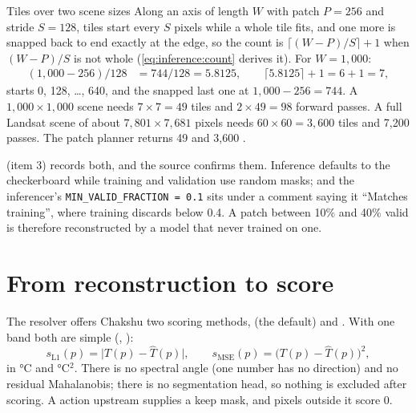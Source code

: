 \begin{worked}[label={we:chakshu:tiles}]{Tiles over two scene sizes}
Along an axis of length $W$ with patch $P=256$ and stride $S=128$, tiles start every $S$ pixels while a whole tile
fits, and one more is snapped back to end exactly at the edge, so the count is $\lceil(W-P)/S\rceil+1$ when
$(W-P)/S$ is not whole (\cref{eq:inference:count} derives it). For $W=1{,}000$:
\begin{align*}
(1{,}000-256)/128 &= 744/128 = 5.8125, \qquad \lceil5.8125\rceil+1 = 6+1 = 7,
\end{align*}
starts 0, 128, \dots, 640, and the snapped last one at $1{,}000-256=744$. A $1{,}000\times1{,}000$ scene needs
$7\times7=49$ tiles and $2\times49=98$ forward passes. A full Landsat scene of about $7{,}801\times7{,}681$ pixels
\tagA{} needs $60\times60=3{,}600$ tiles and 7,200 passes. The patch planner returns 49 and 3,600 \tagC.
\end{worked}

\begin{sourcenote}
 (item 3) records both, and the source confirms them. Inference defaults to the
checkerboard while training and validation use random masks; and the inferencer's \lstinline!MIN_VALID_FRACTION = 0.1!
sits under a comment saying it ``Matches training'', where training discards below 0.4. A patch between 10\% and
40\% valid is therefore reconstructed by a model that never trained on one.
\end{sourcenote}

\section{From reconstruction to score}\label{sec:chakshu:score}

The resolver offers Chakshu two scoring methods,  (the default) and . With one band both are simple
(, ):
\begin{equation}\label{eq:chakshu:score}
s_\text{L1}(p) = \big|T(p)-\hat T(p)\big|, \qquad s_\text{MSE}(p) = \big(T(p)-\hat T(p)\big)^2,
\end{equation}
in °C and °C$^2$. There is no spectral angle (one number has no direction) and no residual Mahalanobis; there is no
segmentation head, so nothing is excluded after scoring. A  action upstream supplies a keep mask,
and pixels outside it score 0.

